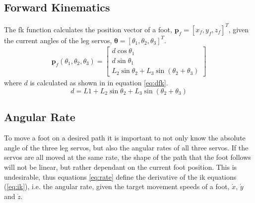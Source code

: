         \subsection{Forward Kinematics}
            The \ac{fk} function calculates the position vector of a foot, \(\bm{p}_f = [x_f,y_f,z_f]^T\),
            given the current angles of the leg servos, \(\bm{\theta} = [\theta_1, \theta_2, \theta_3]^T\).
            \begin{align}
                \bm{p}_f(\theta_1,\theta_2,\theta_3) =
                                \begin{bmatrix}
                                    d\cos{\theta_1}\\
                                    d\sin{\theta_1}\\
                                    L_2\sin{\theta_2} + L_3\sin{\left(\theta_2 + \theta_3\right)}
                                \end{bmatrix}
            \end{align}
            where \(d\) is calculated as shown in in equation \ref{eq:dfk}.
            \begin{equation}\label{eq:dfk}
                d = L1 + L_2\sin{\theta_2} + L_3\sin{(\theta_2 + \theta_3)}
            \end{equation}
        
        \newpage
        \subsection{Angular Rate} \label{sec:ang_rate}
            To move a foot on a desired path it is important to not only know the absolute angle of the three leg servos, but also the angular rates of all three
            servos. If the servos are all moved at the same rate, the shape of the path that the foot follows will not be linear, but rather dependant on the
            current foot position. This is undesirable, thus equations \ref{eq:rate} define the derivative of the \ac{ik} equations (\ref{eq:ik}), i.e. the angular
            rate, given the target movement speeds of a foot, \(\dot{x}\), \(\dot{y}\) and \(\dot{z}\).

